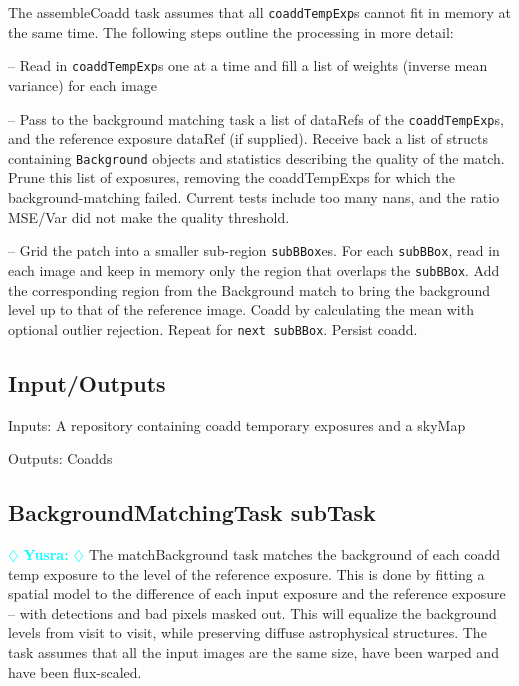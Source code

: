 \documentclass[prd, nofootinbib, floatfix, 11pt,tightenlines,times]{article}
\newcommand{\yusra} { \textcolor{cyan} {
\ensuremath{\diamondsuit} {\bf Yusra:}  
\ensuremath{\diamondsuit} } }
\begin{document}
The assembleCoadd task assumes that all {\tt coaddTempExp}s cannot fit in memory at the same time. The following steps outline the processing in more detail:

-- Read in {\tt coaddTempExp}s one at a time and fill a list of weights (inverse mean variance) for each image 

-- Pass to the background matching task a list of dataRefs of the {\tt coaddTempExp}s, and the reference exposure dataRef (if supplied).  Receive back a list of structs containing {\tt Background} objects and statistics describing the quality of the match.  Prune this list of exposures, removing the coaddTempExps for which the background-matching failed.  Current tests include too many nans, and the ratio MSE/Var did not make the quality threshold.

-- Grid the patch into a smaller sub-region {\tt subBBox}es. For each {\tt subBBox}, read in each image and keep in memory only the region that overlaps the {\tt subBBox}. Add the corresponding region from the Background match to bring the background level up to that of the reference image.  Coadd by calculating the mean with optional outlier rejection.  Repeat for {\tt next subBBox}.  Persist coadd. 



\subsection{Input/Outputs}

Inputs: A repository containing coadd temporary exposures and a skyMap

Outputs: Coadds

\subsection{BackgroundMatchingTask subTask} \yusra
The matchBackground task matches the background of each coadd temp exposure to the level of the reference exposure.   This is done by fitting a spatial model to the difference of each input exposure and the reference exposure -- with detections and bad pixels masked out.  This will equalize the background levels from visit to visit, while preserving diffuse astrophysical structures.  The task assumes that all the input images are the same size, have been warped and have been flux-scaled. 
\end{document}

